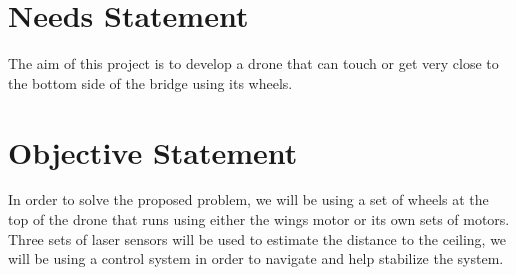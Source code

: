 \documentclass[12pt]{article}
\begin{document}
    \section{Needs Statement}
        The aim of this project is to develop a drone that can touch or get very close to the bottom side of the bridge using its wheels.

    \section{Objective Statement}
        In order to solve the proposed problem, we will be using a set of wheels at the top of the drone that runs using either the wings motor or its own sets of motors. Three sets of laser sensors will be used to estimate the distance to the ceiling, we will be using a control system in order to navigate and help stabilize the system.

    \newpage
\end{document}
